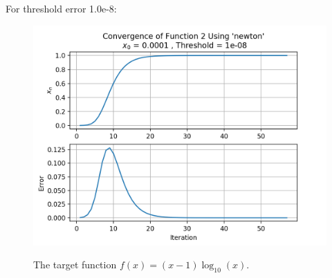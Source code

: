\documentclass[12pt]{article}
\begin{document}
	\newpage
	For threshold  error 1.0e-8:
		\begin{figure}[h]
		\caption{The target function $f(x) = (x-1)\log_{10}(x)$.}
		\centering
		\includegraphics[width=1.0\textwidth]{./figures/initial_condition_2/result_2_1e-08.png}
		\label{fig:plot2dot3}
	\end{figure}
\end{document}
